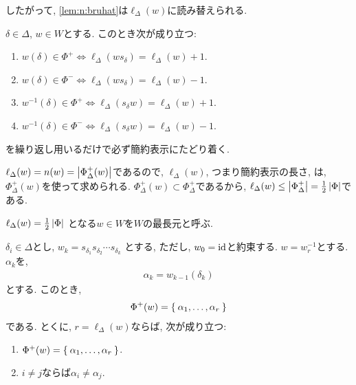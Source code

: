 したがって, \cref{lem:n:bruhat}は$\ell_\Delta(w)$に読み替えられる.
\begin{theorem}
  \label{thm:l:bruhat}
  $\delta\in\Delta$, $w\in W$とする.
  このとき次が成り立つ:
  \begin{enumerate}
  \item
    $w(\delta)\in\Phi^+ \iff \ell_\Delta(ws_\delta)=\ell_\Delta(w)+1$.
  \item $w(\delta)\in\Phi^- \iff \ell_\Delta(ws_\delta)=\ell_\Delta(w)-1$.
  \item
    $w^{-1}(\delta)\in\Phi^+ \iff \ell_\Delta(s_\delta w)=\ell_\Delta(w)+1$.
  \item
    $w^{-1}(\delta)\in\Phi^- \iff \ell_\Delta(s_\delta w)=\ell_\Delta(w)-1$.
  \end{enumerate}
\end{theorem}

\begin{remark}
  を繰り返し用いるだけで必ず簡約表示にたどり着く.
\end{remark}

\begin{remark}
  $\ell_\Delta(w)=n(w)=\left|\Phi_\Delta^+(w)\right|$であるので,
  $\ell_\Delta(w)$, つまり簡約表示の長さ, は,
  $\Phi_{\Delta}^+(w)$を使って求められる.
  $\Phi_{\Delta}^+(w)\subset \Phi_\Delta^+$であるから,
  $\ell_\Delta(w)\leq \left|\Phi_\Delta^+\right|=\frac{1}{2}\left|\Phi\right|$である.
\end{remark}
\begin{definition}
  $\ell_\Delta(w)=\frac{1}{2}\left|\Phi\right|$
  となる$w\in W$を$W$の最長元と呼ぶ.
\end{definition}

\begin{prop}
  $\delta_i\in\Delta$とし,
  $w_{k}=s_{\delta_1}s_{\delta_{2}}\cdots s_{\delta_k}$
  とする, ただし, $w_{0}=\operatorname{id}$と約束する.
  $w=w_{r}^{-1}$とする.
  $\alpha_k$を,
  \begin{align*}
    \alpha_k=w_{k-1}(\delta_{k})
  \end{align*}
  とする.
  このとき,
  \begin{align*}
    \Phi^+(w)=\Set{\alpha_1,\ldots,\alpha_r}
  \end{align*}
  である.
  とくに,
  $r=\ell_\Delta(w)$ならば, 次が成り立つ:
  \begin{enumerate}
  \item
    $\Phi^+(w)=\Set{\alpha_1,\ldots,\alpha_r}$.
  \item
    $i\neq j$ならば$\alpha_i\neq \alpha_j$.
  \end{enumerate}
\end{prop}

